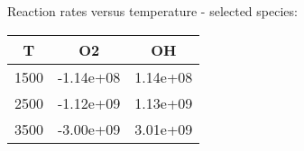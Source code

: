 \documentclass[11pt,letter]{article}
\begin{document}
Reaction rates versus temperature - selected species:\begin{table}[h]
\begin{tabular}{c|c|c}
\hline
T & O2 & OH\\
\hline
1500 & -1.14e+08 & 1.14e+08\\
\hline
2500 & -1.12e+09 & 1.13e+09\\
\hline
3500 & -3.00e+09 & 3.01e+09\\
\end{tabular}
\end{table}
\end{document}
